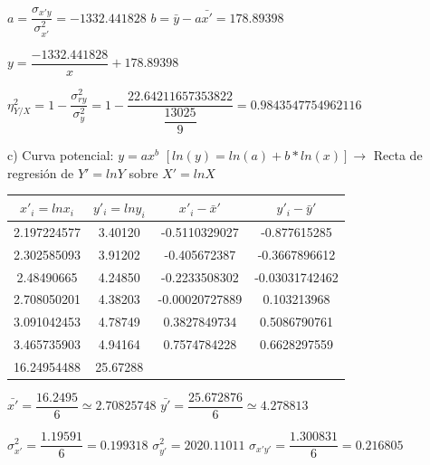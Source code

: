 \documentclass[10pt,a4paper]{article}
\begin{document}
\begin{enumerate}
\vspace{0.25cm}
$a = \dfrac{\sigma_{x'y}}{\sigma_{x'}^2} = -1332.441828$ \hspace{2cm} $b = \bar{y} - a \bar{x'} = 178.89398$

\begin{center}
$y = \dfrac{-1332.441828}{x} + 178.89398$
\end{center}

\vspace{0.25cm}
$\eta_{Y / X}^2 = 1 - \dfrac{\sigma_{ry}^2}{\sigma_y^2} = 1 - \dfrac{22.64211657353822}{\dfrac{13025}{9}} = 0.9843547754962116$

\vspace{0.5cm}
\hspace{0.25cm} c) Curva potencial: $y = ax^b$ \hspace{2pt} $[ln(y) = ln(a) + b*ln(x)] \rightarrow$ Recta de regresión de $Y' = ln Y$ sobre $X' = ln X$

\vspace{0.25cm}
\begin{center}
\begin{tabular}{|c|c|c|c|}
\hline 
$x'_i = ln x_i$ & $y'_i = ln y_i$ & $x'_i - \bar{x}'$ & $y'_i - \bar{y}'$ \\ 
\hline 
2.197224577 & 3.40120 & -0.5110329027 & -0.877615285 \\ 
\hline 
2.302585093 & 3.91202 & -0.405672387 & -0.3667896612 \\ 
\hline 
2.48490665 & 4.24850 & -0.2233508302 & -0.03031742462 \\ 
\hline 
2.708050201 & 4.38203 & -0.00020727889 & 0.103213968 \\ 
\hline 
3.091042453 & 4.78749 & 0.3827849734 & 0.5086790761 \\ 
\hline 
3.465735903 & 4.94164 & 0.7574784228 & 0.6628297559 \\ 
\hline 
16.24954488 & 25.67288 &   &   \\ 
\hline 
\end{tabular} 
\end{center}

$\bar{x'} = \dfrac{16.2495}{6} \simeq 2.70825748$ \hspace{1.5cm} $\bar{y'} = \dfrac{25.672876}{6} \simeq 4.278813$

\vspace{0.25cm}
$\sigma_{x'}^2 = \dfrac{1.19591}{6} = 0.199318$ \hspace{1.5cm} $\sigma_{y'}^2 = 2020.11011$ \hspace{1.5cm} $\sigma_{x'y'} = \dfrac{1.300831}{6} = 0.216805$


\end{enumerate}
\end{document}
